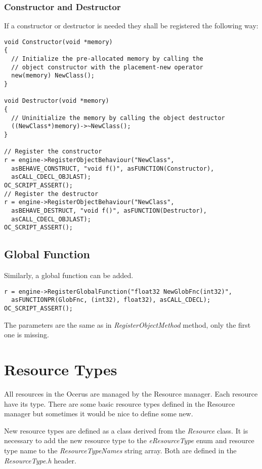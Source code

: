 \documentclass[a4paper, 12pt]{report}
\begin{document}
\subsection{Constructor and Destructor}

If a constructor or destructor is needed they shall be registered the following way:

\footnotesize 
\begin{verbatim}
void Constructor(void *memory)
{
  // Initialize the pre-allocated memory by calling the
  // object constructor with the placement-new operator
  new(memory) NewClass();
}

void Destructor(void *memory)
{
  // Uninitialize the memory by calling the object destructor
  ((NewClass*)memory)->~NewClass();
}

// Register the constructor
r = engine->RegisterObjectBehaviour("NewClass",
  asBEHAVE_CONSTRUCT, "void f()", asFUNCTION(Constructor),
  asCALL_CDECL_OBJLAST);
OC_SCRIPT_ASSERT();
// Register the destructor
r = engine->RegisterObjectBehaviour("NewClass",
  asBEHAVE_DESTRUCT, "void f()", asFUNCTION(Destructor),
  asCALL_CDECL_OBJLAST);
OC_SCRIPT_ASSERT();

\end{verbatim}
\normalsize

\section{Global Function}
Similarly, a global function can be added.

\footnotesize 
\begin{verbatim}
r = engine->RegisterGlobalFunction("float32 NewGlobFnc(int32)", 
  asFUNCTIONPR(GlobFnc, (int32), float32), asCALL_CDECL);
OC_SCRIPT_ASSERT();
\end{verbatim}
\normalsize

The parameters are the same as in \emph{RegisterObjectMethod} method, only the first one is missing.

\chapter{Resource Types}

All resources in the Ocerus are managed by the Resource manager. Each resource have its type. There are some basic resource types defined in the Resource manager but sometimes it would be nice to define some new.

New resource types are defined as a class derived from the \emph{Resource} class. It is necessary to add the new resource type to the \emph{eResourceType} enum and resource type name to the \emph{ResourceTypeNames} string array. Both are defined in the \emph{ResourceType.h} header.
\end{document}
